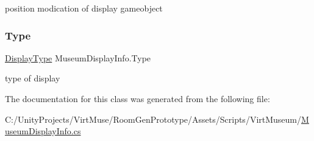 position modication of display gameobject 

\mbox{\label{class_museum_display_info_af1d44e6a63020a6ba8e2f5dff181ecbf}} 
\subsubsection{\texorpdfstring{Type}{Type}}
{\footnotesize\ttfamily \mbox{\hyperlink{_museum_8cs_a18c0cbeece6bcb1c64d7463ce253ff50}{Display\+Type}} Museum\+Display\+Info.\+Type}



type of display 



The documentation for this class was generated from the following file\+:\begin{DoxyCompactItemize}
\item 
C\+:/\+Unity\+Projects/\+Virt\+Muse/\+Room\+Gen\+Prototype/\+Assets/\+Scripts/\+Virt\+Museum/\mbox{\hyperlink{_museum_display_info_8cs}{Museum\+Display\+Info.\+cs}}\end{DoxyCompactItemize}
